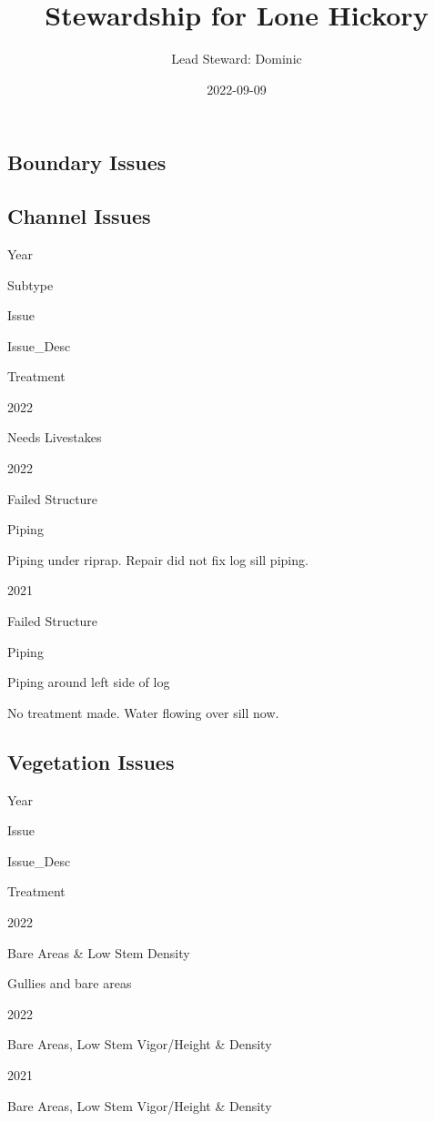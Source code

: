 \documentclass[
  landscape]{article}
\title{Stewardship for Lone Hickory}
\author{Lead Steward: Dominic}
\date{2022-09-09}
\begin{document}
\maketitle

\hypertarget{boundary-issues}{%
\subsection{Boundary Issues}\label{boundary-issues}}

\hypertarget{channel-issues}{%
\subsection{Channel Issues}\label{channel-issues}}

Year

Subtype

Issue

Issue\_Desc

Treatment

2022

Needs Livestakes

2022

Failed Structure

Piping

Piping under riprap. Repair did not fix log sill piping.

2021

Failed Structure

Piping

Piping around left side of log

No treatment made. Water flowing over sill now.

\hypertarget{vegetation-issues}{%
\subsection{Vegetation Issues}\label{vegetation-issues}}

Year

Issue

Issue\_Desc

Treatment

2022

Bare Areas \& Low Stem Density

Gullies and bare areas

2022

Bare Areas, Low Stem Vigor/Height \& Density

2021

Bare Areas, Low Stem Vigor/Height \& Density
\end{document}
